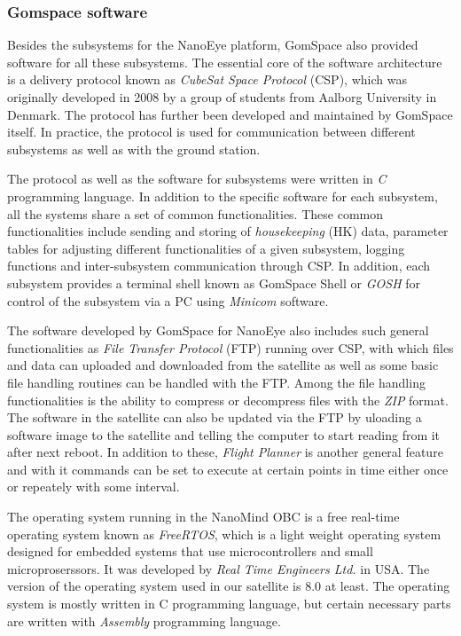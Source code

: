 \documentclass[english,12pt,a4paper,pdftex,elec,utf8]{aaltothesis}
\begin{document}
\subsubsection{Gomspace software}
Besides the subsystems for the NanoEye platform, GomSpace also provided software for all these subsystems. The essential core of the software architecture is a delivery protocol known as \textit{CubeSat Space Protocol} (CSP), which was originally developed in 2008 by a group of students from Aalborg University in Denmark. The protocol has further been developed and maintained by GomSpace itself. In practice, the protocol is used for communication between different subsystems as well as with the ground station.\par 
The protocol as well as the software for subsystems were written in \textit{C} programming language. In addition to the specific software for each subsystem, all the systems share a set of common functionalities. These common functionalities include sending and storing of \textit{housekeeping} (HK) data, parameter tables for adjusting different functionalities of a given subsystem, logging functions and inter-subsystem communication through CSP. In addition, each subsystem provides a terminal shell known as GomSpace Shell or \textit{GOSH} for control of the subsystem via a PC using \textit{Minicom} software. \par 
The software developed by GomSpace for NanoEye also includes such general functionalities as \textit{File Transfer Protocol} (FTP) running over CSP, with which files and data can uploaded and downloaded from the satellite as well as some basic file handling routines can be handled with the FTP. Among the file handling functionalities is the ability to compress or decompress files with the \textit{ZIP} format. The software in the satellite can also be updated via the FTP by uloading a software image to the satellite and telling the computer to start reading from it after next reboot. In addition to these, \textit{Flight Planner} is another general feature and with it commands can be set to execute at certain points in time either once or repeately with some interval.\par
The operating system running in the NanoMind OBC is a free real-time operating system known as \textit{FreeRTOS}, which is a light weight operating system designed for embedded systems that use microcontrollers and small microproserssors. It was developed by \textit{Real Time Engineers Ltd.} in USA. The version of the operating system used in our satellite is 8.0 at least. The operating system is mostly written in C programming language, but certain necessary parts are written with \textit{Assembly} programming language.\par 
\end{document}
